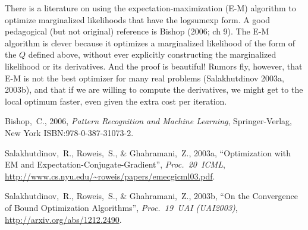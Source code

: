 \documentclass[12pt]{article}
\begin{document}
There is a literature on using the expectation-maximization (E-M)
algorithm to optimize marginalized likelihoods that have the logsumexp
form.
A good pedagogical (but not original) reference is Bishop (2006; ch
9).
The E-M algorithm is clever because it optimizes a marginalized
likelihood of the form of the $Q$ defined above, without ever
explicitly constructing the marginalized likelihood or its
derivatives.
And the proof is beautiful!
Rumors fly, however, that E-M is not the best optimizer for many
real problems (Salakhutdinov 2003a, 2003b), and that if we are willing
to compute the derivatives, we might get to the local optimum faster,
even given the extra cost per iteration.

\begin{trivlist}\raggedright
\item
Bishop,~C., 2006,
\textit{Pattern Recognition and Machine Learning},
Springer-Verlag, New York
{\footnotesize ISBN:978-0-387-31073-2}.
\item
Salakhutdinov,~R., Roweis,~S., \& Ghahramani,~Z., 2003a,
``Optimization with EM and Expectation-Conjugate-Gradient'',
\textit{Proc.~20~ICML},
{\footnotesize \url{http://www.cs.nyu.edu/~roweis/papers/emecgicml03.pdf}}.
\item
Salakhutdinov,~R., Roweis,~S., \& Ghahramani,~Z., 2003b,
``On the Convergence of Bound Optimization Algorithms'',
\textit{Proc.~19~UAI (UAI2003)},
{\footnotesize \url{http://arxiv.org/abs/1212.2490}}.
\end{trivlist}
\end{document}
